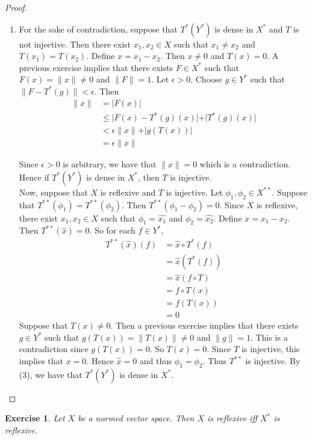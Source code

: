 \documentclass[12pt]{amsart}
\newtheorem{ex}[thm]{Exercise}
\newcommand{\ep}{\epsilon}
\begin{document}
\begin{proof}
\begin{enumerate}
			\item For the sake of contradiction, suppose that $T^*(Y^*)$ is dense in $X^*$ and $T$ is not injective. Then there exist $x_1, x_2 \in X$ such that $x_1 \neq x_2$ and $T(x_1) = T(x_2)$. Define $x = x_1-x_2$. Then $x \neq 0$ and $T(x) = 0$. A previous exercise implies that there exists $F \in X^*$ such that $F(x) = \|x\|\neq 0$ and $\|F \|= 1$. Let $\ep >0$. Choose $g \in Y^*$ such that $\|F - T^*(g) \|< \ep$. Then 
			\begin{align*}
				\|x \|
				&= \vert F(x) \vert \\
				&\leq \vert F(x) - T^*(g)(x) \vert + \vert T^*(g)(x) \vert \\
				& < \ep \|x \|+ \vert g(T(x)) \vert\\
				&= \ep \|x \|
			\end{align*}
			
			Since $\ep > 0$ is arbitrary, we have that $\|x \|=0$ which is a contradiction. Hence if $T^*(Y^*) $ is dense in $X^*$, then $T$ is injective. \vspace{.5cm}\\ 
			Now, suppose that $X$ is reflexive and $T$ is injective. Let $\phi_1, \phi_2 \in X^{**}$. Suppose that $T^{**}(\phi_1) = T^{**}(\phi_2)$. Then $T^{**}(\phi_1 - \phi_2) = 0$. Since $X$ is reflexive, there exist $x_1, x_2 \in X$ such that $\phi_1 = \hat{x_1}$ and $\phi_2 = \hat{x_2}$. Define $x = x_1 - x_2$. Then $T^{**}(\hat{x}) = 0$. So for each $f \in Y^*$, 
			\begin{align*}
				T^{**}(\hat{x})(f) 
				&= \hat{x} \circ T^*(f)\\
				&= \hat{x}( T^*(f))\\
				&= \hat{x} (f \circ T)\\
				&= f \circ T(x)\\
				&= f(T(x))\\
				&= 0 
			\end{align*}
			Suppose that $T(x) \neq 0$. Then a previous exercise implies that there exists $g \in Y^*$ such that $g(T(x)) = \|T(x) \|\neq 0$ and $\|g \| = 1$. This is a contradiction since $g(T(x)) = 0$. So $T(x) = 0$. Since $T$ is injective, this implies that $x = 0$. Hence $\hat{x}=0$ and thus $\phi_1 = \phi_2$. Thus $T^{**}$ is injective. By (3), we have that $T^*(Y^*)$ is dense in $X^*$.
		\end{enumerate}
	\end{proof}
	
	\begin{ex}
		Let $X$ be a normed vector space. Then $X$ is reflexive iff $X^*$ is reflexive. 
	\end{ex}
	
\end{document}
